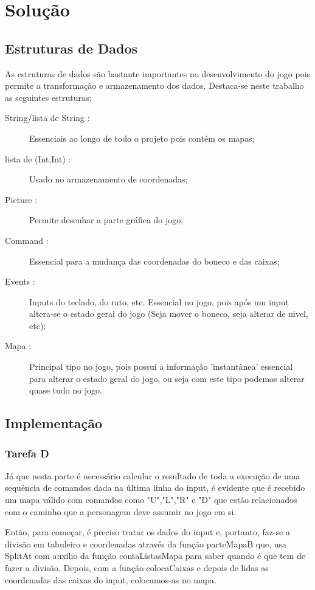 \documentclass[a4paper]{article}
\begin{document}
\section{Solução}
\label{sec:solucao}

\subsection{Estruturas de Dados}

As estruturas de dados são bastante importantes no desenvolvimento do jogo pois permite a transformação e armazenamento dos dados. Destaca-se neste trabalho as seguintes estruturas:

\begin{description}
    \item[String/lista de String :] Essenciais ao longo de todo o projeto pois contém os mapas;
    \item[lista de (Int,Int) :] Usado no armazenamento de coordenadas;
    \item[Picture :] Permite desenhar a parte gráfica do jogo;
    \item[Command :] Essencial para a mudança das coordenadas do boneco e das caixas;
    \item[Events :] Inputs do teclado, do rato, etc. Essencial no jogo, pois após um input altera-se o estado geral do jogo (Seja mover o boneco, seja alterar de nivel, etc);
    \item[Mapa :] Principal tipo no jogo, pois possui a informação 'instantânea' essencial para alterar o estado geral do jogo, ou seja com este tipo podemos alterar quase tudo no jogo.
\end{description}

\subsection{Implementação}
\subsubsection{Tarefa D}
Já que nesta parte é necessário calcular o resultado de toda a execução de uma sequência de comandos dada na última linha do input, é evidente que é recebido um mapa válido com comandos como "U","L","R" e "D" que estão relacionados com o caminho que a personagem deve assumir no jogo em si. 

Então, para começar, é preciso tratar os dados do input e, portanto, faz-se a divisão em tabuleiro e coordenadas através da função parteMapaB que, usa SplitAt com auxílio da função contaListasMapa para saber quando é que tem de fazer a divisão.
Depois, com a função colocaCaixas e depois de lidas as coordenadas das caixas do input, colocamos-as no mapa.
\end{document}
